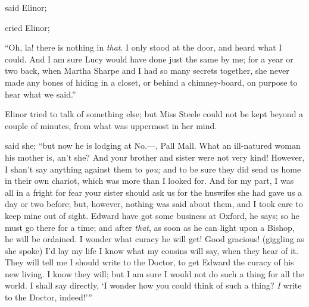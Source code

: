  said Elinor; 


 cried Elinor; 

“Oh, la! there is nothing in {\em that}. I only stood at the door, and heard what I could. And I am sure Lucy would have done just the same by me; for a year or two back, when Martha Sharpe and I had so many secrets together, she never made any bones of hiding in a closet, or behind a chimney-board, on purpose to hear what we said.”

Elinor tried to talk of something else; but Miss Steele could not be kept beyond a couple of minutes, from what was uppermost in her mind.

 said she; “but now he is lodging at No.---, Pall Mall. What an ill-natured woman his mother is, an't she? And your brother and sister were not very kind! However, I shan't say anything against them to {\em you;} and to be sure they did send us home in their own chariot, which was more than I looked for. And for my part, I was all in a fright for fear your sister should ask us for the huswifes she had gave us a day or two before; but, however, nothing was said about them, and I took care to keep mine out of sight. Edward have got some business at Oxford, he says; so he must go there for a time; and after {\em that}, as soon as he can light upon a Bishop, he will be ordained. I wonder what curacy he will get! Good gracious! (giggling as she spoke) I'd lay my life I know what my cousins will say, when they hear of it. They will tell me I should write to the Doctor, to get Edward the curacy of his new living. I know they will; but I am sure I would not do such a thing for all the world.  I shall say directly, ‘I wonder how you could think of such a thing? {\em I} write to the Doctor, indeed!'”

